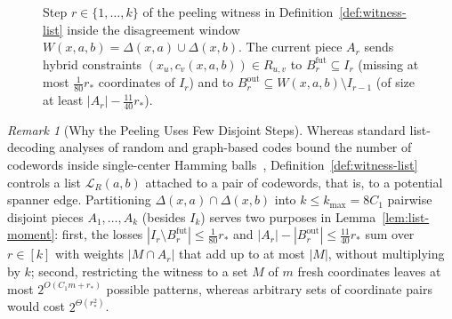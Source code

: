 \documentclass[11pt]{article}
\theoremstyle{definition}
\theoremstyle{remark}
\newtheorem{remark}[theorem]{Remark}
\begin{document}
\begin{figure}[ht]
\caption{Step $r \in \{1, \dots, k\}$ of the peeling witness in Definition~\ref{def:witness-list} inside the disagreement window $W(x, a, b) = \Delta(x, a) \cup \Delta(x, b)$. The current piece $A_r$ sends hybrid constraints $(x_u, c_v(x, a, b)) \in R_{u, v}$ to $B_r^{\mathrm{fut}} \subseteq I_r$ (missing at most $\frac{1}{80} r_*$ coordinates of $I_r$) and to $B_r^{\mathrm{out}} \subseteq W(x, a, b) \setminus I_{r-1}$ (of size at least $|A_r| - \frac{11}{40} r_*$).}
\label{fig:hybrid-biclique}
\end{figure}

\begin{remark}[Why the Peeling Uses Few Disjoint Steps]
\label{rem:biclique-entropy}
Whereas standard list-decoding analyses of random and graph-based codes bound the number of codewords inside single-center Hamming balls~\cite{guruswami2002combinatorial,mosheiff2020ldpc}, Definition~\ref{def:witness-list} controls a list $\mathcal{L}_R(a, b)$ attached to a pair of codewords, that is, to a potential spanner edge. Partitioning $\Delta(x, a) \cap \Delta(x, b)$ into $k \le k_{\max} = 8 C_1$ pairwise disjoint pieces $A_1, \dots, A_k$ (besides $I_k$) serves two purposes in Lemma~\ref{lem:list-moment}: first, the losses $|I_r \setminus B_r^{\mathrm{fut}}| \le \frac{1}{80} r_*$ and $|A_r| - |B_r^{\mathrm{out}}| \le \frac{11}{40} r_*$ sum over $r \in [k]$ with weights $|M \cap A_r|$ that add up to at most $|M|$, without multiplying by $k$; second, restricting the witness to a set $M$ of $m$ fresh coordinates leaves at most $2^{O(C_1 m + r_*)}$ possible patterns, whereas arbitrary sets of coordinate pairs would cost $2^{\Theta(r_*^2)}$.
\end{remark}
\end{document}
